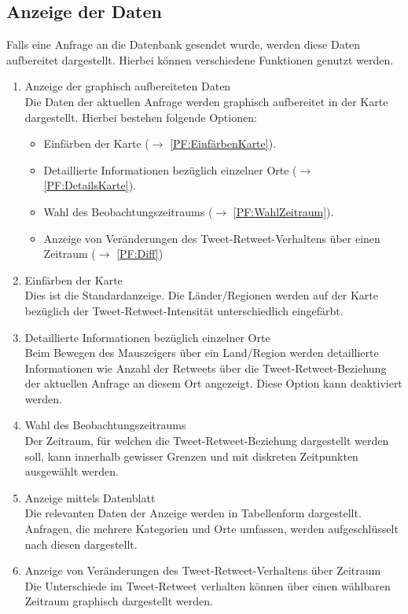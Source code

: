\subsection{Anzeige der Daten}	
Falls eine Anfrage an die Datenbank gesendet wurde, werden diese Daten aufbereitet dargestellt. Hierbei können verschiedene Funktionen genutzt werden.
\begin{enumerate}[ align=left, label={\textbf{\textbackslash F20\arabic*0\textbackslash}} ]	
	\item Anzeige der graphisch aufbereiteten Daten \\
	Die Daten der aktuellen Anfrage werden graphisch aufbereitet in der Karte dargestellt.
	Hierbei bestehen folgende Optionen:
	\begin{itemize}
		\item Einfärben der Karte ($\rightarrow$ \ref{PF:EinfärbenKarte}).
		\item Detaillierte Informationen bezüglich einzelner Orte ($\rightarrow$ \ref{PF:DetailsKarte}).
		\item Wahl des Beobachtungszeitraums ($\rightarrow$ \ref{PF:WahlZeitraum}).
		\item Anzeige von Veränderungen des Tweet-Retweet-Verhaltens über einen Zeitraum ($\rightarrow$ \ref{PF:Diff})
	\end{itemize}
	
	\item Einfärben der Karte \label{PF:EinfärbenKarte} \\
	Dies ist die Standardanzeige. Die Länder/Regionen werden auf der Karte bezüglich der Tweet-Retweet-Intensität unterschiedlich eingefärbt.
	\item Detaillierte Informationen bezüglich einzelner Orte \label{PF:DetailsKarte} \\
	Beim Bewegen des Mauszeigers über ein Land/Region werden detaillierte Informationen wie Anzahl der Retweets über die Tweet-Retweet-Beziehung der aktuellen Anfrage an diesem Ort angezeigt. Diese Option kann deaktiviert werden.
	\item Wahl des Beobachtungszeitraums \label{PF:WahlZeitraum} \\
	Der Zeitraum, für welchen die Tweet-Retweet-Beziehung dargestellt werden soll, kann innerhalb gewisser Grenzen und mit diskreten Zeitpunkten ausgewählt werden.
	
	\item Anzeige mittels Datenblatt \label{PF:AnzeigeDatenblatt} \\
	Die relevanten Daten der Anzeige werden in Tabellenform dargestellt. Anfragen, die  mehrere Kategorien und Orte umfassen, werden aufgeschlüsselt nach diesen dargestellt.
	
	\item Anzeige von Veränderungen des Tweet-Retweet-Verhaltens über Zeitraum \label{PF:Diff} \\
	Die Unterschiede im Tweet-Retweet verhalten können über einen wählbaren Zeitraum graphisch dargestellt werden.
\end{enumerate}

